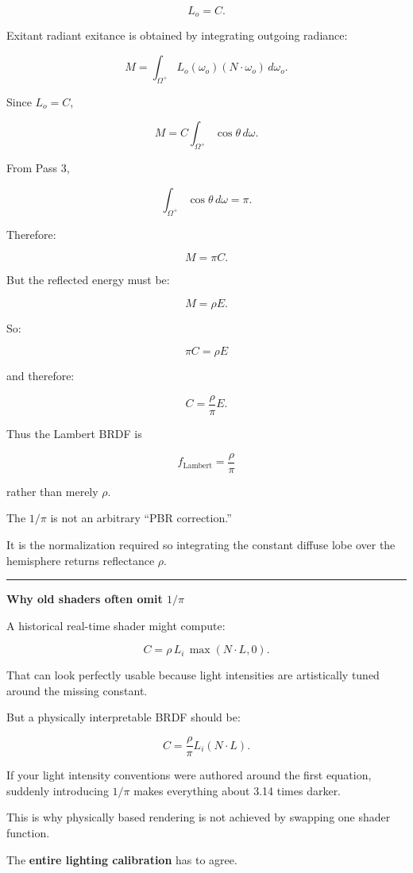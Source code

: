 \[
L_o=C.
\]

Exitant radiant exitance is obtained by integrating outgoing radiance:

\[
M=
\int_{\Omega^+}
L_o(\omega_o)
(N\cdot\omega_o)
\,d\omega_o.
\]

Since \(L_o=C\),

\[
M=
C
\int_{\Omega^+}
\cos\theta\,d\omega.
\]

From Pass 3,

\[
\int_{\Omega^+}
\cos\theta\,d\omega
=
\pi.
\]

Therefore:

\[
M=\pi C.
\]

But the reflected energy must be:

\[
M=\rho E.
\]

So:

\[
\pi C=\rho E
\]

and therefore:

\[
C=\frac{\rho}{\pi}E.
\]

Thus the Lambert BRDF is

\[
\boxed{
f_{\text{Lambert}}
=
\frac{\rho}{\pi}
}
\]

rather than merely \(\rho\).

The \(1/\pi\) is not an arbitrary ``PBR correction.''

It is the normalization required so integrating the constant diffuse lobe over the hemisphere returns reflectance \(\rho\).

\begin{center}\rule{0.5\linewidth}{0.5pt}\end{center}

\textbf{Why old shaders often omit \(1/\pi\)}

A historical real-time shader might compute:

\[
C=
\rho\,L_i\,\max(N\cdot L,0).
\]

That can look perfectly usable because light intensities are artistically tuned around the missing constant.

But a physically interpretable BRDF should be:

\[
C=
\frac{\rho}{\pi}
L_i
(N\cdot L).
\]

If your light intensity conventions were authored around the first equation, suddenly introducing \(1/\pi\) makes everything about 3.14 times darker.

This is why physically based rendering is not achieved by swapping one shader function.

The \textbf{entire lighting calibration} has to agree.

